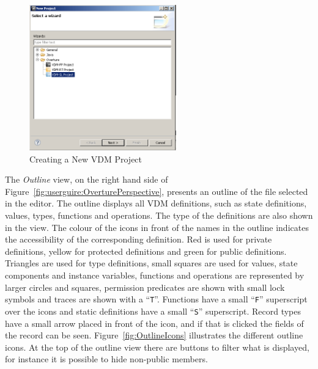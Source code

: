 \documentclass{overturerepchap}
\begin{document}
\begin{figure}[!h]
\begin{center}
  \caption[labelInTOC]{Creating a New VDM Project}
  \label{fig:userguide:newOvertureProjectSL}
  \includegraphics[width=2.5in]{figures/newovertureSLproject}
\end{center}
\end{figure}


The \emph{Outline} view, on the right hand side of 
Figure~\ref{fig:userguire:OverturePerspective}, presents an outline of
the file selected
in the editor. The outline displays all VDM definitions, such as
state definitions, values, types, functions and operations. The
type of the definitions are also shown in the view.
The colour of the icons in front of the names in the outline
indicates the accessibility of the corresponding definition. Red is
used for private definitions, yellow for protected definitions and
green for public definitions. Triangles are used for
type definitions, small squares are used for values, state components
and instance variables, functions and operations are represented by
larger circles and squares, permission predicates are shown with small
lock symbols and traces are shown with a
``\texttt{T}''. Functions have a small ``\texttt{F}'' superscript over the
icons and static definitions have a small ``\texttt{S}'' superscript.
Record types have a small arrow placed in front of the
icon, and if that is clicked the fields of the record can be seen.
Figure~\ref{fig:OutlineIcons} illustrates the different outline icons.
At the top of the outline view there are buttons to filter what is displayed,
for instance it is possible to hide non-public members.
\end{document}
